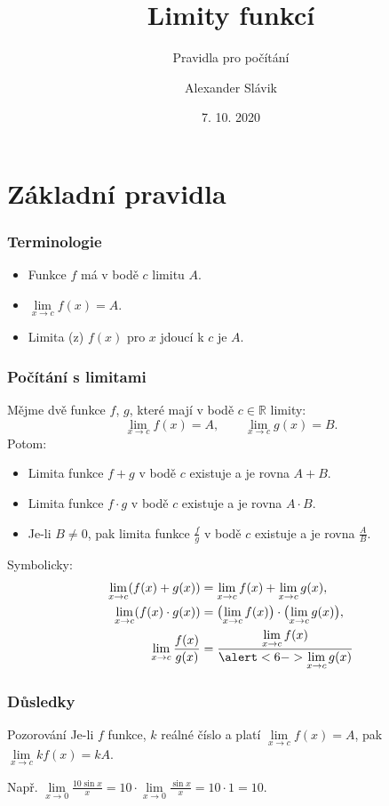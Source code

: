 \documentclass[handout]%
{beamer}
\title{Limity funkcí}
\author{Alexander Slávik} %
\subtitle{Pravidla pro počítání}
\institute{Gymnázium Voděradská}
\date{7. 10. 2020}
\newcommand{\R}{\mathbb R}
\begin{document}
%



\section{Základní pravidla}


\begin{frame}
\frametitle{Terminologie}

\begin{itemize}
	\item Funkce $f$ má v bodě $c$ limitu $A$.\pause
	\item $\lim\limits_{x \to c} f(x) = A$.\pause
	\item Limita (z) $f(x)$ pro $x$ jdoucí k $c$ je $A$.
\end{itemize}


\end{frame}



\begin{frame}
	\frametitle{Počítání s limitami}
	Mějme dvě funkce $f$, $g$, které mají v bodě $c \in \R$ limity:
	\[ \lim_{x\to c}f(x) = A, \qquad \lim_{x\to c}g(x) = B. \]
	Potom:\pause
	\begin{itemize}
		\item Limita funkce $f + g$ v bodě $c$ existuje a je rovna $A + B$.\pause
		\item Limita funkce $f \cdot g$ v bodě $c$ existuje a je rovna $A \cdot B$.\pause
		\item Je-li \alert<6->{$B \neq 0$}, pak limita funkce $\frac fg$ v bodě $c$ existuje a je rovna $\frac AB$.
	\end{itemize}
	\pause
	Symbolicky:
	\begin{align*}
	\lim_{x \to c}(f(x) + g(x)) &= \lim_{x \to c}f(x) + \lim_{x \to c}g(x),\\
	\lim_{x \to c}(f(x) \cdot g(x)) &= \bigl(\lim_{x \to c}f(x)\bigr) \cdot \bigl(\lim_{x \to c}g(x)\bigr),\\
	\lim_{x \to c}\frac{f(x)}{g(x)} &= \frac{\lim\limits_{x \to c}f(x)}{\alert<6->{\lim\limits_{x \to c}g(x)}}
	\end{align*}\pause
	
\end{frame}


\begin{frame}
	\frametitle{Důsledky}
	

	\begin{block}{Pozorování}
	Je-li $f$ funkce, $k$ reálné číslo a platí $\lim\limits_{x \to c} f(x) = A$, pak $\lim\limits_{x \to c} kf(x) = kA$.
	\end{block}
	
	\bigskip
	\pause
	Např. $\lim\limits_{x \to 0} \frac{10 \sin x}{x} = 10 \cdot \lim\limits_{x \to 0} \frac{\sin x}{x} = 10 \cdot 1 = 10$.
	
\end{frame}
\end{document}
